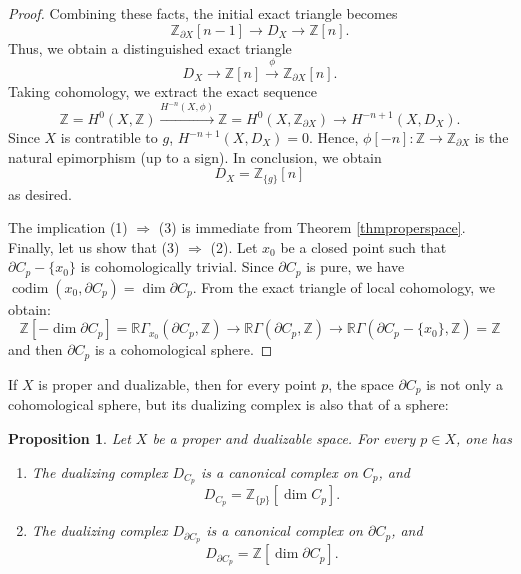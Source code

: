 \documentclass[amssymb,amscd,11pt,20pt]{amsart}
\newcommand{\codim}{{\operatorname{codim}}}
\newcommand{\ZZ}{{\mathbb Z}}
\newcommand{\RR}{\mathbb R}
\newcommand{\0}{\mathbf 0}
\theoremstyle{plain}
\newtheorem{prop}[thm]{Proposition}
\newtheorem{rem}[thm]{Remark}
\numberwithin{equation}{thm}
\begin{document}
\begin{proof}
Combining these facts, the initial exact triangle becomes
\[ \ZZ_{\partial X}[n-1]\to D_X\to \ZZ[n].\] Thus, we obtain a distinguished exact triangle   $$D_X\to \ZZ[n]\overset{\phi}\to \ZZ_{\partial X}[n].$$ 
Taking cohomology, we extract the exact sequence 
\[\ZZ=H^0(X,\ZZ)\overset{H^{-n}(X,\phi)}\longrightarrow \ZZ=H^0(X,\ZZ_{\partial X})\to H^{-n+1}(X,D_X) .\] Since $X$ is contratible to $g$, $H^{-n+1}(X,D_X)=0$. Hence, $\phi[-n]\colon\ZZ\to\ZZ_{\partial X}$ is the natural epimorphism (up to a sign). In conclusion, we obtain
\[D_X=\ZZ_{\{g\}}[n]\] as desired.


The implication (1) $\Rightarrow $ (3) is immediate from Theorem \ref{thmproperspace}. Finally, let us show that (3) $\Rightarrow $ (2). Let $x_0$ be a closed point such that $\partial C_p-\{x_0\}$ is cohomologically trivial. Since $\partial C_p$ is pure, we have $\codim(x_0,\partial C_p)=\dim\partial C_p$. From the exact triangle of local cohomology, we obtain:  \[ \ZZ [-\dim \partial C_p ] =\RR\Gamma_{x_0}(\partial C_p,\ZZ)\to \RR\Gamma (\partial C_p,\ZZ)\to \RR\Gamma (\partial C_p-\{ x_0\},\ZZ)=\ZZ \]
and then $\partial C_p$ is a cohomological sphere. 
\end{proof}


If $X$ is proper and dualizable, then for every point \(p\), the space $\partial C_p$ is not only a cohomological sphere, but its dualizing complex is also that of a sphere:

\begin{prop} Let $X$ be a proper and dualizable space. For every $p\in X$, one has

\begin{enumerate}
\item The dualizing complex $D_{C_p}$ is a canonical complex on $C_p$, and \[D_{C_p}=\ZZ_{\{p\}}[\dim C_p].\]

\item The dualizing complex $D_{\partial C_p}$ is a canonical complex on $\partial C_p$, and
\[ D_{\partial C_p}=\ZZ [\dim \partial C_p].\]
\end{enumerate}
\end{prop}
\end{document}
